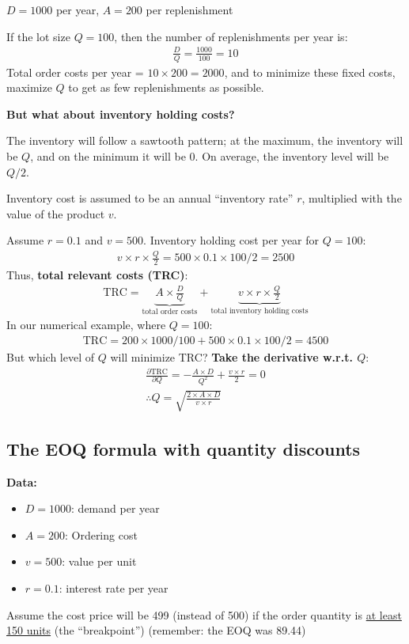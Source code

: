 \documentclass[10pt]{article}
\begin{document}
$D = 1000 $ per year, $A = 200 $ per replenishment

If the lot size $Q = 100 $, then the number of replenishments per year is:
\begin{gather*}
    \frac{D}{Q} = \frac{1000}{100} = 10
\end{gather*}
Total order costs per year = $10\times 200 = 2000 $, and to minimize these fixed costs, maximize $Q $ to get as few replenishments as possible.

\textbf{But what about inventory holding costs?}

The inventory will follow a sawtooth pattern; at the maximum, the inventory will be $Q $, and on the minimum it will be $0 $. On average, the inventory level will be $Q / 2 $.

Inventory cost is assumed to be an annual ``inventory rate'' $r $, multiplied with the value of the product $v $.

Assume $r = 0.1 $ and $v = 500 $. Inventory holding cost per year for $Q = 100 $: 
\begin{gather*}
    v\times r \times \frac{Q}{2} = 500\times 0.1\times 100/2 = 2500 
\end{gather*}
Thus, \textbf{total relevant costs (TRC)}:
\begin{gather*}
    \text{TRC} = \underbrace{A\times \frac{D}{Q}}_{\text{total order costs}} + \underbrace{v\times r\times \frac{Q}{2}}_{\text{total inventory holding costs}}
\end{gather*}
In our numerical example, where $Q = 100 $:
\begin{gather*}
    \text{TRC} = 200\times 1000 / 100 + 500\times 0.1\times 100 / 2 = 4500
\end{gather*}
But which level of $Q $ will minimize TRC? \textbf{Take the derivative w.r.t. $Q$}:
\begin{gather*}
    \frac{\partial\text{TRC}}{\partial Q} = -\frac{A\times D}{Q^2} + \frac{v\times r}{2} = 0\\
    \therefore \boxed{Q = \sqrt{\frac{2\times A\times D}{v\times r}}}
\end{gather*}
\newpage 
\subsection{The EOQ formula with quantity discounts}
\textbf{Data:}
\begin{itemize}
    \item $D = 1000 $: demand per year 
    \item $A = 200 $: Ordering cost 
    \item $v = 500 $: value per unit 
    \item $r = 0.1 $: interest rate per year 
\end{itemize}
Assume the cost price will be 499 (instead of 500) if the order quantity is \underline{at least 150 units} (the ``breakpoint'') (remember: the EOQ was 89.44)
\end{document}
